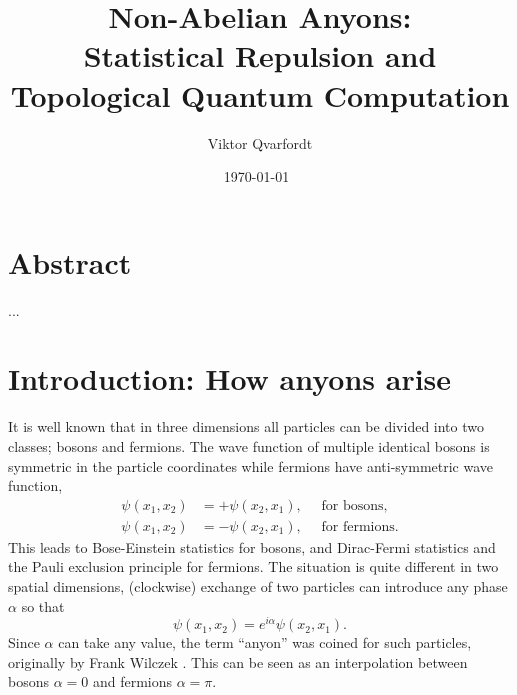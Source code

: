 \documentclass[a4paper,10pt,oneside]{book}
\theoremstyle{plain}
\theoremstyle{definition}
\theoremstyle{remark}
\begin{document}


\title{Non-Abelian Anyons:\\Statistical Repulsion and\\Topological Quantum Computation}
\author{Viktor Qvarfordt}
\date{\isodate\today\ \currenttime}


\maketitle

\chapter*{Abstract}

...

\tableofcontents

\newpage
























\chapter{Introduction: How anyons arise}\label{chap:how anyons arise}

It is well known that in three dimensions all particles can be divided into two classes; bosons and fermions. The wave function of multiple identical bosons is symmetric in the particle coordinates while fermions have anti-symmetric wave function,
\begin{equation}
  \begin{aligned}
    \psi(x_1, x_2) &= + \psi(x_2, x_1), \quad \text{ for bosons,} \\
    \psi(x_1, x_2) &= - \psi(x_2, x_1), \quad \text{ for fermions}.
  \end{aligned}
\end{equation}
This leads to Bose-Einstein statistics for bosons, and Dirac-Fermi statistics and the Pauli exclusion principle for fermions. The situation is quite different in two spatial dimensions, (clockwise) exchange of two particles can introduce any phase $\alpha$ so that
\begin{equation}
  \psi(x_1, x_2) = e^{i\alpha} \psi(x_2, x_1).
\end{equation}
Since $\alpha$ can take any value, the term ``anyon'' was coined for such particles, originally by Frank Wilczek \cite{wilczek}. This can be seen as an interpolation between bosons $\alpha = 0$ and fermions $\alpha = \pi$.
\end{document}
